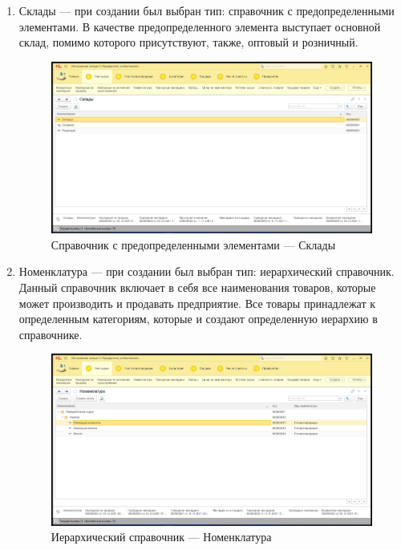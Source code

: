 \documentclass[12pt,a4paper]{article}
\begin{document}
\begin{enumerate}
    \item Склады --- при создании был выбран тип: справочник с предопределенными элементами. В качестве предопределенного элемента выступает основной склад, помимо которого присутствуют, также, оптовый и розничный.
    
    \begin{figure}[!ht]
        \centering
        \includegraphics[scale=0.4]{Справочник с предопределенными элементами.png}
        \caption{Справочник с предопределенными элементами --- Склады}
        \label{fig:warehouse}
    \end{figure}
    
    \item Номенклатура --- при создании был выбран тип: иерархический справочник. Данный справочник включает в себя все наименования товаров, которые может производить и продавать предприятие. Все товары принадлежат к определенным категориям, которые и создают определенную иерархию в справочнике.
    
    \begin{figure}[!ht]
        \centering
        \includegraphics[scale=0.4]{Иерархический справочник.png}
        \caption{Иерархический справочник --- Номенклатура}
        \label{fig:Nomenclature}
    \end{figure}
    \newpage
\end{enumerate}
\end{document}

